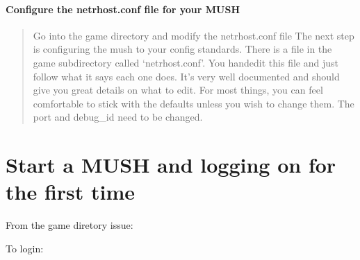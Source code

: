 \documentclass[letterpaper,10pt,english]{sphinxmanual}
\begin{document}
\paragraph{Configure the netrhost.conf file for your MUSH}
\label{\detokenize{install:configure-the-netrhost-conf-file-for-your-mush}}\begin{quote}

\sphinxAtStartPar
Go into the game directory and modify the netrhost.conf file
The next step is configuring the mush to your config standards.
There is a file in the game subdirectory called ‘netrhost.conf’.
You hand\sphinxhyphen{}edit this file and just follow what it says each
one does.  It’s very well documented and should give you
great details on what to edit.  For most things, you can
feel comfortable to stick with the defaults unless you wish
to change them.  The port and debug\_id need to be changed.
\end{quote}


\section{Start a  MUSH and logging on for the first time}
\label{\detokenize{install:start-a-mush-and-logging-on-for-the-first-time}}
\sphinxAtStartPar
From the game diretory issue:

\begin{sphinxVerbatim}[commandchars=\\\{\}]
\end{sphinxVerbatim}

\sphinxAtStartPar
To login:

\begin{sphinxVerbatim}[commandchars=\\\{\}]
  
\end{sphinxVerbatim}
\end{document}
